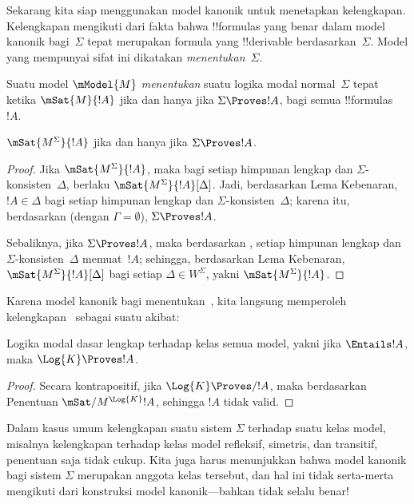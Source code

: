\documentclass[../../../include/open-logic-section]{subfiles}
\begin{document}


Sekarang kita siap menggunakan model kanonik untuk menetapkan kelengkapan.
Kelengkapan mengikuti dari fakta bahwa !!{formula}s yang benar dalam model
kanonik bagi~$\Sigma$ tepat merupakan formula yang !!{derivable}
berdasarkan~$\Sigma$. Model yang mempunyai sifat ini dikatakan
\emph{menentukan}~$\Sigma$.

\begin{defn}
  Suatu model $\mModel{M}$ \emph{menentukan} suatu logika modal
  normal~$\Sigma$ tepat ketika $\mSat{M}{!A}$ jika dan hanya jika $\Sigma
  \Proves !A$, bagi semua !!{formula}s~$!A$.
\end{defn}

\begin{thm}[Penentuan]
   $\mSat{M^\Sigma}{!A}$ jika dan hanya jika $\Sigma \Proves !A$.
\end{thm}

\begin{proof}
  Jika $\mSat{M^\Sigma}{!A}$, maka bagi setiap himpunan lengkap dan
  $\Sigma$-konsisten~$\Delta$, berlaku
  $\mSat{M^\Sigma}{!A}[\Delta]$. Jadi, berdasarkan Lema Kebenaran,
  $!A \in \Delta$ bagi setiap himpunan lengkap dan
  $\Sigma$-konsisten~$\Delta$; karena itu, berdasarkan
   (dengan $\Gamma =
  \emptyset$), $\Sigma \Proves !A$.

  Sebaliknya, jika $\Sigma \Proves !A$, maka berdasarkan
  , setiap
  himpunan lengkap dan $\Sigma$-konsisten~$\Delta$ memuat~$!A$; sehingga,
  berdasarkan Lema Kebenaran, $\mSat{M^\Sigma}{!A}[\Delta]$ bagi setiap
  $\Delta \in W^\Sigma$, yakni $\mSat{M^\Sigma}{!A}$.
\end{proof}

Karena model kanonik bagi  menentukan~, kita langsung
memperoleh kelengkapan~ sebagai suatu akibat:

\begin{cor}
  Logika modal dasar  lengkap terhadap kelas semua model, yakni jika
  $\Entails !A$, maka $\Log{K} \Proves !A$.
\end{cor}

\begin{proof}
  Secara kontrapositif, jika $\Log{K} \Proves/ !A$, maka berdasarkan
  Penentuan $\mSat/{M^{\Log{K}}}{!A}$, sehingga $!A$ tidak valid.
\end{proof}

Dalam kasus umum kelengkapan suatu sistem $\Sigma$ terhadap suatu kelas
model, misalnya kelengkapan  terhadap kelas model refleksif,
simetris, dan transitif, penentuan saja tidak cukup. Kita juga harus
menunjukkan bahwa model kanonik bagi sistem $\Sigma$ merupakan anggota kelas
tersebut, dan hal ini tidak serta-merta mengikuti dari konstruksi model
kanonik---bahkan tidak selalu benar!
\end{document}
